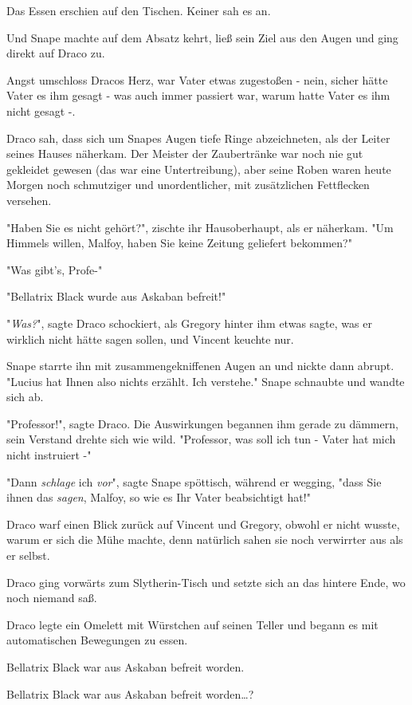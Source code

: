 {Das Essen erschien auf den Tischen. Keiner sah es an.

Und Snape machte auf dem Absatz kehrt, ließ sein Ziel aus den Augen und ging direkt auf Draco zu.

Angst umschloss Dracos Herz, war Vater etwas zugestoßen - nein, sicher hätte Vater es ihm gesagt - was auch immer passiert war, warum hatte Vater es ihm nicht gesagt -.

Draco sah, dass sich um Snapes Augen tiefe Ringe abzeichneten, als der Leiter seines Hauses näherkam. Der Meister der Zaubertränke war noch nie gut gekleidet gewesen (das war eine Untertreibung), aber seine Roben waren heute Morgen noch schmutziger und unordentlicher, mit zusätzlichen Fettflecken versehen.

"Haben Sie es nicht gehört?", zischte ihr Hausoberhaupt, als er näherkam. "Um Himmels willen, Malfoy, haben Sie keine Zeitung geliefert bekommen?"

"Was gibt's, Profe-"

"Bellatrix Black wurde aus Askaban befreit!"

"\emph{Was?}", sagte Draco schockiert, als Gregory hinter ihm etwas sagte, was er wirklich nicht hätte sagen sollen, und Vincent keuchte nur.

Snape starrte ihn mit zusammengekniffenen Augen an und nickte dann abrupt. "Lucius hat Ihnen also nichts erzählt. Ich verstehe." Snape schnaubte und wandte sich ab.

"Professor!", sagte Draco. Die Auswirkungen begannen ihm gerade zu dämmern, sein Verstand drehte sich wie wild. "Professor, was soll ich tun - Vater hat mich nicht instruiert -"

"Dann \emph{schlage} ich \emph{vor}", sagte Snape spöttisch, während er wegging, "dass Sie ihnen das \emph{sagen}, Malfoy, so wie es Ihr Vater beabsichtigt hat!"

Draco warf einen Blick zurück auf Vincent und Gregory, obwohl er nicht wusste, warum er sich die Mühe machte, denn natürlich sahen sie noch verwirrter aus als er selbst.

Draco ging vorwärts zum Slytherin-Tisch und setzte sich an das hintere Ende, wo noch niemand saß.

Draco legte ein Omelett mit Würstchen auf seinen Teller und begann es mit automatischen Bewegungen zu essen.

Bellatrix Black war aus Askaban befreit worden.

Bellatrix Black war aus Askaban befreit worden…?

}
